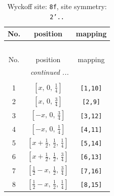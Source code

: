 \documentclass[fleqn,8pt]{jsarticle}
\begin{document}
\begin{longtable}{ccc}
\caption{Wyckoff site: {\tt 8f}, site symmetry: {\tt 2'..}}
 \\
 \hline \hline
No. & position & mapping \\ \hline \endfirsthead

\multicolumn{2}{l}{\tablename\ \thetable{}} \\
 \hline \hline
No. & position & mapping \\ \hline \endhead

 \hline \hline
\multicolumn{2}{r}{\footnotesize\it continued ...} \\ \endfoot

 \hline \hline
\multicolumn{2}{r}{} \\ \endlastfoot

1 & $\left[ x,\, 0,\, \frac{1}{4} \right]$ & {\tt [1,10]} \\ \hline
2 & $\left[ x,\, 0,\, \frac{3}{4} \right]$ & {\tt [2,9]} \\ \hline
3 & $\left[ - x,\, 0,\, \frac{3}{4} \right]$ & {\tt [3,12]} \\ \hline
4 & $\left[ - x,\, 0,\, \frac{1}{4} \right]$ & {\tt [4,11]} \\ \hline
5 & $\left[ x + \frac{1}{2},\, \frac{1}{2},\, \frac{1}{4} \right]$ & {\tt [5,14]} \\ \hline
6 & $\left[ x + \frac{1}{2},\, \frac{1}{2},\, \frac{3}{4} \right]$ & {\tt [6,13]} \\ \hline
7 & $\left[ \frac{1}{2} - x,\, \frac{1}{2},\, \frac{3}{4} \right]$ & {\tt [7,16]} \\ \hline
8 & $\left[ \frac{1}{2} - x,\, \frac{1}{2},\, \frac{1}{4} \right]$ & {\tt [8,15]} \\
\end{longtable}
\renewcommand{\arraystretch}{1.2}
\end{document}

